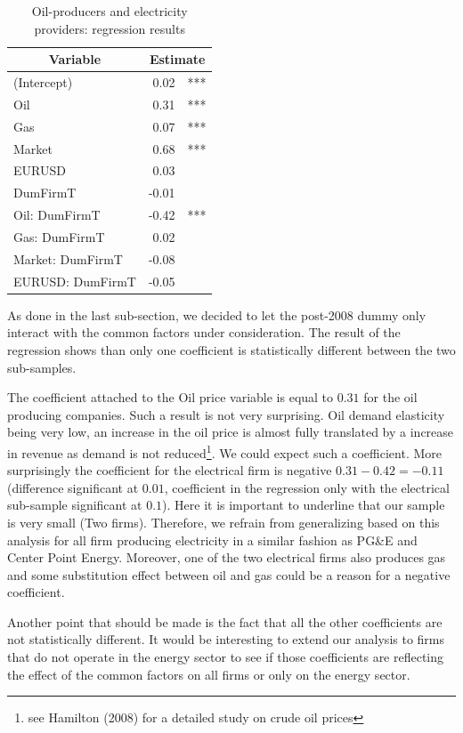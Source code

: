 \documentclass[a4paper]{article}
\begin{document}
\begin{table}[ht]
\centering
\begin{tabular}{l|rl}
\hline
\hline
\multicolumn{1}{c|}{Variable} & \multicolumn{2}{c}{Estimate}  \\ 
\hline
(Intercept) & 0.02 & *** \\ 
Oil & 0.31 & *** \\ 
Gas & 0.07 & *** \\ 
Market & 0.68 & *** \\ 
EURUSD & 0.03 &  \\ 
DumFirmT & -0.01 &  \\ 
Oil: DumFirmT & -0.42 & *** \\ 
Gas: DumFirmT & 0.02 &  \\ 
Market: DumFirmT & -0.08 &  \\ 
EURUSD: DumFirmT & -0.05 &  \\ 
\hline
\hline
\end{tabular}
\label{}
\caption{Oil-producers and electricity providers: regression results}
\end{table}

As done in the last sub-section, we decided to let the post-2008 dummy only interact with the common factors under consideration. The result of the regression shows than only one coefficient is statistically different between the two sub-samples.

The coefficient attached to the Oil price variable is equal to $0.31$ for the oil producing companies. Such a result is not very surprising. Oil demand elasticity being very low, an increase in the oil price is almost fully translated by a increase in revenue as demand is not reduced\footnote{see Hamilton (2008) for a detailed study on crude oil prices}. We could expect such a coefficient. More surprisingly the coefficient for the electrical firm is negative $0.31 - 0.42 = -0.11$ (difference significant at $0.01$, coefficient in the regression only with the electrical sub-sample significant at $0.1$). Here it is important to underline that our sample is very small (Two firms). Therefore, we refrain from generalizing based on this analysis for all firm producing electricity in a similar fashion as PG\&E and Center Point Energy. Moreover, one of the two electrical firms also produces gas and some substitution effect between oil and gas could be a reason for a negative coefficient. 

Another point that should be made is the fact that all the other coefficients are not statistically different. It would be interesting to extend our analysis to firms that do not operate in the energy sector to see if those coefficients are reflecting the effect of the common factors on all firms or only on the energy sector.
\end{document}
